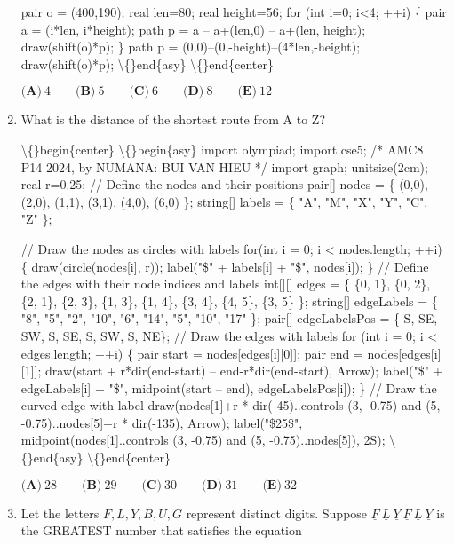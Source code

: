 \documentclass{article}
\begin{document}
\begin{enumerate}[label=\arabic*., itemsep=0.5em]
pair o = (400,190);
real len=80;
real height=56;
for (int i=0; i<4; ++i) \{
    pair a = (i*len, i*height);
    path p = a -- a+(len,0) -- a+(len, height);
    draw(shift(o)*p);
\}
path p = (0,0)--(0,-height)--(4*len,-height);
draw(shift(o)*p);
\textbackslash\{\}end\{asy\}
\textbackslash\{\}end\{center\}



\(\textbf{(A)}\ 4 \qquad \textbf{(B)}\ 5 \qquad \textbf{(C)}\ 6 \qquad \textbf{(D)}\ 8 \qquad \textbf{(E)}\ 12\)\par \vspace{0.5em}\item What is the distance of the shortest route from A to Z?


\textbackslash\{\}begin\{center\}
\textbackslash\{\}begin\{asy\}
import olympiad;
import cse5;
/* AMC8 P14 2024, by NUMANA: BUI VAN HIEU */
import graph;
unitsize(2cm);
real r=0.25;
// Define the nodes and their positions
pair[] nodes = \{ (0,0), (2,0), (1,1), (3,1), (4,0), (6,0) \};
string[] labels = \{ "A", "M", "X", "Y", "C", "Z" \};

// Draw the nodes as circles with labels
for(int i = 0; i < nodes.length; ++i) \{
    draw(circle(nodes[i], r));
    label("\$" + labels[i] + "\$", nodes[i]);
\}
// Define the edges with their node indices and labels
int[][] edges = \{ \{0, 1\}, \{0, 2\}, \{2, 1\}, \{2, 3\}, \{1, 3\}, \{1, 4\}, \{3, 4\}, \{4, 5\}, \{3, 5\} \};
string[] edgeLabels = \{ "8", "5", "2", "10", "6", "14", "5", "10", "17" \};
pair[] edgeLabelsPos = \{ S, SE, SW, S, SE, S, SW, S, NE\};
// Draw the edges with labels
for (int i = 0; i < edges.length; ++i) \{
    pair start = nodes[edges[i][0]];
    pair end = nodes[edges[i][1]];
    draw(start + r*dir(end-start) -- end-r*dir(end-start), Arrow);
    label("\$" + edgeLabels[i] + "\$", midpoint(start -- end),  edgeLabelsPos[i]);
\}
// Draw the curved edge with label
draw(nodes[1]+r * dir(-45)..controls (3, -0.75) and (5, -0.75)..nodes[5]+r * dir(-135), Arrow);
label("\$25\$", midpoint(nodes[1]..controls (3, -0.75) and (5, -0.75)..nodes[5]), 2S);
\textbackslash\{\}end\{asy\}
\textbackslash\{\}end\{center\}


\(\textbf{(A)}\ 28 \qquad \textbf{(B)}\ 29 \qquad \textbf{(C)}\ 30 \qquad \textbf{(D)}\ 31 \qquad \textbf{(E)}\ 32\)\par \vspace{0.5em}\item Let the letters \(F,L,Y,B,U,G\) represent distinct digits. Suppose \(\underline{F}~\underline{L}~\underline{Y}~\underline{F}~\underline{L}~\underline{Y}\) is the GREATEST number that satisfies the equation



\end{enumerate}
\end{document}

